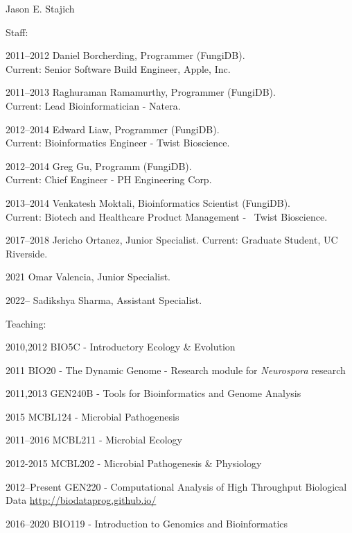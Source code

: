\documentclass[10pt]{article}
\begin{document}
\begin{cv}{\centerline{Jason E. Stajich}}
\begin{cvlistcompact}{Staff:}
\item [2011--2012] Daniel Borcherding, Programmer (FungiDB). \\ Current: Senior Software Build Engineer, Apple, Inc.
\item [2011--2013] Raghuraman Ramamurthy, Programmer (FungiDB). \\ Current: Lead Bioinformatician - Natera.
\item [2012--2014] Edward Liaw, Programmer (FungiDB). \\ Current: Bioinformatics Engineer - Twist Bioscience.
\item [2012--2014] Greg Gu, Programm (FungiDB). \\ Current: Chief Engineer - PH Engineering Corp.
\item [2013--2014] Venkatesh Moktali, Bioinformatics Scientist (FungiDB). \\ Current: Biotech and Healthcare Product Management -  Twist Bioscience.
\item [2017--2018] Jericho Ortanez, Junior Specialist. Current: Graduate Student, UC Riverside.
\item [2021] Omar Valencia, Junior Specialist.
\item [2022--] Sadikshya Sharma, Assistant Specialist.
\end{cvlistcompact}

\begin{cvlistcompact}{Teaching:}
\item [2010,2012] BIO5C - Introductory Ecology \& Evolution
\item [2011] BIO20 - The Dynamic Genome - Research module for \textit{Neurospora} research
\item [2011,2013] GEN240B - Tools for Bioinformatics and Genome Analysis
\item [2015] MCBL124 - Microbial Pathogenesis
\item [2011--2016] MCBL211 - Microbial Ecology
\item [2012-2015] MCBL202 - Microbial Pathogenesis \& Physiology
\item [2012--Present] GEN220 - Computational Analysis of High Throughput Biological Data \url{http://biodataprog.github.io/}
\item [2016--2020] BIO119 - Introduction to Genomics and Bioinformatics

\end{cvlistcompact}


\end{cv}
\end{document}
